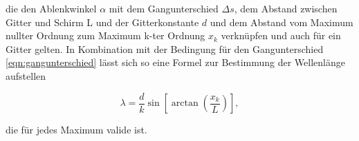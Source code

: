        die den Ablenkwinkel $\alpha$ mit dem Gangunterschied $\Delta s$, dem Abstand zwischen Gitter und Schirm L und der Gitterkonstante $d$ und dem Abstand vom Maximum nullter Ordnung zum Maximum k-ter 
        Ordnung $x_k$ verknüpfen und auch für ein Gitter gelten. In Kombination mit der Bedingung für den Gangunterschied \ref{eqn:gangunterschied} lässt sich so eine Formel zur Bestimmung der Wellenlänge aufstellen

        \begin{equation}
            \lambda = \frac{d}{k} \sin\left[\arctan \left(\frac{x_k}{L}\right) \right],
            \label{eqn:Wellenlänge}
        \end{equation}

        die für jedes Maximum valide ist.